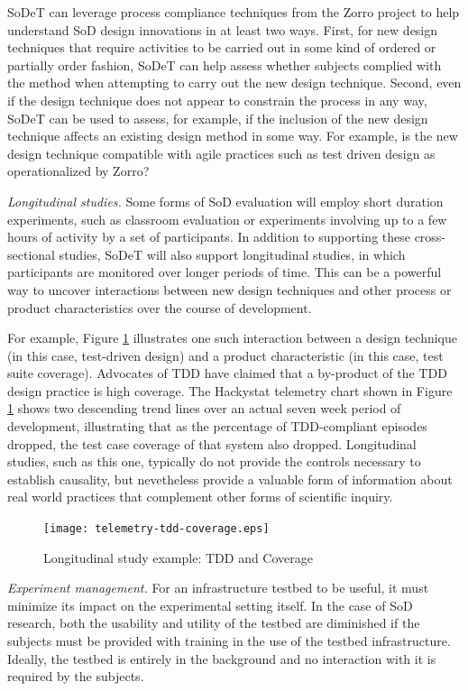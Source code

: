 SoDeT can leverage process compliance techniques from the Zorro project to 
help understand SoD design innovations in at least two ways.  First, for
new design techniques that require activities to be carried out in some kind
of ordered or partially order fashion, SoDeT can help assess whether subjects
complied with the method when attempting to carry out the new design technique. 
Second, even if the design technique does not appear to constrain the process
in any way, SoDeT can be used to assess, for example, if the inclusion of the
new design technique affects an existing design method in some way. For example, 
is the new design technique compatible with agile practices such as test driven 
design as operationalized by Zorro?


{\em Longitudinal studies.}  Some forms of SoD evaluation will employ short
duration experiments, such as classroom evaluation or experiments involving
up to a few hours of activity by a set of participants.  In addition to
supporting these cross-sectional studies, SoDeT will also support
longitudinal studies, in which participants are monitored over longer
periods of time.  This can be a powerful way to uncover interactions
between new design techniques and other process or product characteristics
over the course of development.

For example, Figure \ref{fig:telemetry-coverage} illustrates one such interaction
between a design technique (in this case, test-driven design) and a product
characteristic (in this case, test suite coverage).  Advocates of TDD have
claimed that a by-product of the TDD design practice is high coverage.  The
Hackystat telemetry chart shown in Figure \ref{fig:telemetry-coverage}
shows two descending trend lines over an actual seven week period of development,
illustrating that as the percentage of TDD-compliant episodes dropped, the
test case coverage of that system also dropped.  Longitudinal studies, such
as this one, typically do not provide the controls necessary to establish
causality, but nevetheless provide a valuable form of information about
real world practices that complement other forms of scientific inquiry.

\begin{figure}[th]
  \center
  \texttt{[image: telemetry-tdd-coverage.eps]}
  \caption{Longitudinal study example: TDD and Coverage}
  \label{fig:telemetry-coverage}
\end{figure} 


{\em Experiment management.}  For an infrastructure testbed to be useful, 
it must minimize its impact on the experimental setting itself.  In the case
of SoD research, both the usability and utility of the testbed are diminished
if the subjects must be provided with training in the use of the testbed 
infrastructure.  Ideally, the testbed is entirely in the background and no 
interaction with it is required by the subjects. 

